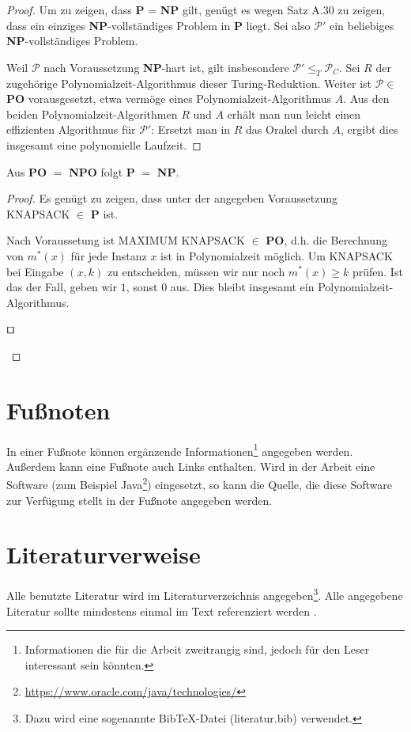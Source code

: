 \begin{proof}
Um zu zeigen, dass \textbf{P} = \textbf{NP} gilt, genügt es wegen Satz A.30 zu zeigen, dass ein einziges \textbf{NP}-vollständiges Problem in \textbf{P} liegt. Sei also $\mathcal{P}'$ ein beliebiges \textbf{NP}-vollständiges Problem.

Weil $\mathcal{P}$ nach Voraussetzung \textbf{NP}-hart ist, gilt insbesondere $\mathcal{P}' \leq_T \mathcal{P}_C$. Sei $R$ der zugehörige Polynomialzeit-Algorithmus dieser Turing-Reduktion. Weiter ist $\mathcal{P} \in$ \textbf{PO} vorausgesetzt, etwa vermöge eines Polynomialzeit-Algorithmus $A$. Aus den beiden Polynomialzeit-Algorithmen $R$ und $A$ erhält man nun leicht einen effizienten Algorithmus für $\mathcal{P}'$: Ersetzt man in $R$ das Orakel durch $A$, ergibt dies insgesamt eine polynomielle Laufzeit.

\end{proof}

\begin{lemma}
Aus \textbf{PO} $=$ \textbf{NPO} folgt \textbf{P} $=$ \textbf{NP}.
\end{lemma}

\begin{proof}
Es genügt zu zeigen, dass unter der angegeben Voraussetzung KNAPSACK $\in$ \textbf{P} ist.

Nach Voraussetung ist MAXIMUM KNAPSACK $\in$ \textbf{PO}, d.h. die Berechnung von $m^*(x)$ für jede Instanz $x$ ist in Polynomialzeit möglich. Um KNAPSACK bei Eingabe $(x,k)$ zu entscheiden, müssen wir nur noch $m^*(x) \geq k$ prüfen. Ist das der Fall, geben wir $1$, sonst $0$ aus. Dies bleibt insgesamt ein Polynomialzeit-Algorithmus.

\begin{flushright}$\qed$\end{flushright}
\end{proof}

\section{Fußnoten}

In einer Fußnote können ergänzende Informationen\footnote{Informationen die für die Arbeit zweitrangig sind, jedoch für den Leser interessant sein könnten.} angegeben werden. Außerdem kann eine Fußnote auch Links enthalten. Wird in der Arbeit eine Software (zum Beispiel Java\footnote{\url{https://www.oracle.com/java/technologies/}}) eingesetzt, so kann die Quelle, die diese Software zur Verfügung stellt in der Fußnote angegeben werden.

\section{Literaturverweise}

Alle benutzte Literatur wird im Literaturverzeichnis angegeben\footnote{Dazu wird eine sogenannte BibTeX-Datei (literatur.bib) verwendet.}. Alle angegebene Literatur sollte mindestens einmal im Text referenziert werden \cite{Cormen:90}.
